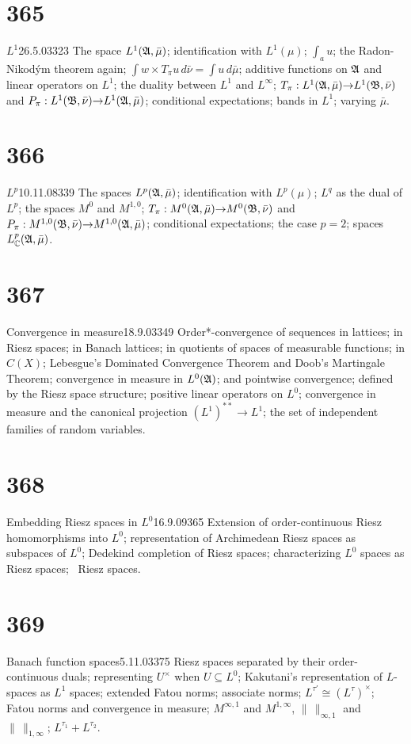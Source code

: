 \section{365}{$L^1$}{26.5.03}{323}{}
{The space $L^1(\frak{A},\bar\mu)$;  identification with
$L^1(\mu)$;  $\int_au$;  the Radon-Nikod\'ym theorem again;
${\int}w{\times}T_{\pi}u\,d\bar\nu={\int}u\,d\bar\mu$;  additive functions on $\frak{A}$ and linear operators
on $L^1$;  the duality between $L^1$ and $L^{\infty}$;  $T_{\pi}:L^1(\frak{A},\bar\mu){\to}L^1(\frak{B},\bar\nu)$ and
$P_{\pi}:L^1(\frak{B},\bar\nu){\to}L^1(\frak{A},\bar\mu)$;  conditional
expectations;  bands in $L^1$;  varying $\bar\mu$.}
     
\section{366}{$L^p$}{10.11.08}{339}{}
{The spaces $L^p(\frak{A},\bar\mu)$;  identification with
$L^p(\mu)$;  $L^q$ as the dual of $L^p$;  the spaces $M^0$ and
$M^{1,0}$;  $T_{\pi}:M^0(\frak{A},\bar\mu){\to}M^0(\frak{B},\bar\nu)$
and
$P_{\pi}:M^{1,0}(\frak{B},\bar\nu){\to}M^{1,0}(\frak{A},\bar\mu)$;
conditional expectations;  the case $p=2$;  spaces 
$L^p_{\Bbb{C}}(\frak{A},\bar\mu)$.}
     
\section{367}{Convergence in measure}{18.9.03}{349}{}
{Order*-convergence of sequences in lattices;  in Riesz spaces;
in Banach lattices;  in quotients of spaces of measurable functions;  in
$C(X)$;   Lebesgue's Dominated Convergence Theorem and Doob's
Martingale Theorem;  convergence in measure in $L^0(\frak{A})$;  and
pointwise convergence;  defined by the Riesz space structure;  positive
linear operators on $L^0$;  convergence in measure and the canonical
projection $(L^1)^{**}{\to}L^1$;  the set of independent families of random variables.}
     
\section{368}{Embedding Riesz spaces in $L^0$}{16.9.09}{365}{}
{Extension of order-continuous Riesz homomorphisms into $L^0$;
representation of Archimedean Riesz spaces as subspaces of $L^0$;
Dedekind completion of Riesz spaces;  characterizing $L^0$ spaces as
Riesz spaces;  \wsid\ Riesz spaces.}
     
\section{369}{Banach function spaces}{5.11.03}{375}{}
{Riesz spaces separated by their order-continuous duals;
representing $U^{\times}$ when $U{\subseteq}L^0$;  Kakutani's
representation of $L$-spaces as $L^1$ spaces;  extended Fatou norms;
associate norms;  $L^{\tau'}\cong(L^{\tau})^{\times}$;  Fatou norms and
convergence in measure;  $M^{\infty,1}$ and $M^{1,\infty}$,
$\|\,\|_{\infty,1}$ and $\|\,\|_{1,\infty}$;  $L^{\tau_1}+L^{\tau_2}$.}
     
